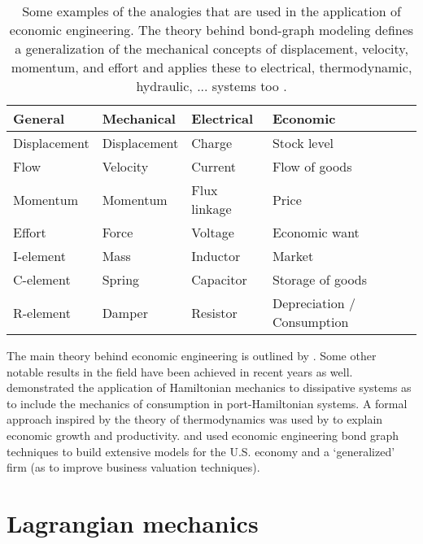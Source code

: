 \begin{table}[h]
    \centering
    \caption{Some examples of the analogies that are used in the application of economic engineering. The theory behind bond-graph modeling defines a generalization of the mechanical concepts of displacement, velocity, momentum, and effort and applies these to electrical, thermodynamic, hydraulic, ... systems too \cite{Karnopp2012}.}
    \label{tab:analogies}
    \begin{tabular}{llll}
        \toprule
        \textbf{General} & \textbf{Mechanical} & \textbf{Electrical} & \textbf{Economic} \\ 
        \midrule
        Displacement & Displacement & Charge & Stock level\\
        Flow & Velocity & Current & Flow of goods \\
        Momentum & Momentum & Flux linkage & Price \\
        Effort & Force & Voltage & Economic want \\
        \midrule
        I-element & Mass & Inductor & Market \\
        C-element & Spring & Capacitor & Storage of goods \\
        R-element & Damper & Resistor & Depreciation / Consumption \\
        \bottomrule
    \end{tabular}
\end{table}
The main theory behind economic engineering is outlined by \citet{Mendel2019}. Some other notable results in the field have been achieved in recent years as well. \citet{Hutters2020b} demonstrated the application of Hamiltonian mechanics to dissipative systems as to include the mechanics of consumption in port-Hamiltonian systems. A formal approach inspired by the theory of thermodynamics was used by \citet{Manders2019} to explain economic growth and productivity. \citet{Kruimer2021} and \citet{VanArdenne2020} used economic engineering bond graph techniques to build extensive models for the U.S. economy and a `generalized' firm (as to improve business valuation techniques).

\section{Lagrangian mechanics}
